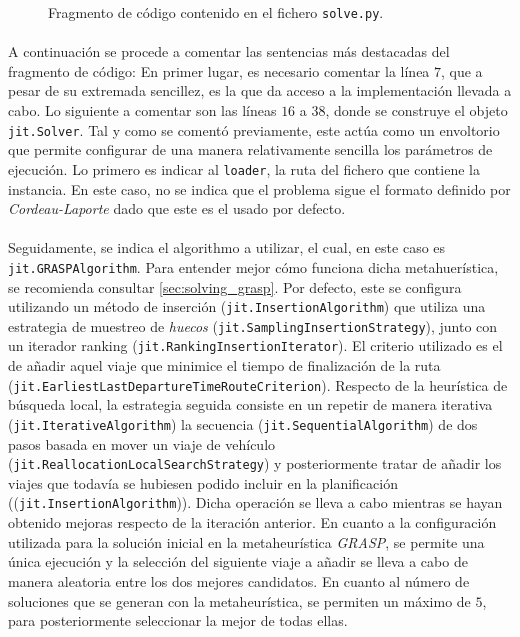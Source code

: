 \documentclass{subfiles}
\begin{document}
        \begin{figure}[!hb]
          \centering
          \inputminted[frame=single,framesep=10pt,linenos]{python}{./code/solve.py}
          \caption{Fragmento de código contenido en el fichero \texttt{solve.py}.}
          \label{code:solve}
        \end{figure}

        \paragraph{}
        A continuación se procede a comentar las sentencias más destacadas del fragmento de código: En primer lugar, es necesario comentar la línea $7$, que a pesar de su extremada sencillez, es la que da acceso a la implementación llevada a cabo. Lo siguiente a comentar son las líneas $16$ a $38$, donde se construye el objeto \texttt{jit.Solver}. Tal y como se comentó previamente, este actúa como un envoltorio que permite configurar de una manera relativamente sencilla los parámetros de ejecución. Lo primero es indicar al \texttt{loader}, la ruta del fichero que contiene la instancia. En este caso, no se indica que el problema sigue el formato definido por \emph{Cordeau-Laporte} dado que este es el usado por defecto.

        \paragraph{}
        Seguidamente, se indica el algorithmo a utilizar, el cual, en este caso es \texttt{jit.GRASPAlgorithm}. Para entender mejor cómo funciona dicha metahuerística, se recomienda consultar \cref{sec:solving_grasp}. Por defecto, este se configura utilizando un método de inserción (\texttt{jit.InsertionAlgorithm}) que utiliza una estrategia de muestreo de \emph{huecos} (\texttt{jit.SamplingInsertionStrategy}), junto con un iterador ranking (\texttt{jit.RankingInsertionIterator}). El criterio utilizado es el de añadir aquel viaje que minimice el tiempo de finalización de la ruta (\texttt{jit.EarliestLastDepartureTimeRouteCriterion}). Respecto de la heurística de búsqueda local, la estrategia seguida consiste en un repetir de manera iterativa (\texttt{jit.IterativeAlgorithm}) la secuencia (\texttt{jit.SequentialAlgorithm}) de dos pasos basada en mover un viaje de vehículo (\texttt{jit.ReallocationLocalSearchStrategy}) y posteriormente tratar de añadir los viajes que todavía se hubiesen podido incluir en la planificación ((\texttt{jit.InsertionAlgorithm})). Dicha operación se lleva a cabo mientras se hayan obtenido mejoras respecto de la iteración anterior. En cuanto a la configuración utilizada para la solución inicial en la metaheurística \emph{GRASP}, se permite una única ejecución y la selección del siguiente viaje a añadir se lleva a cabo de manera aleatoria entre los dos mejores candidatos. En cuanto al número de soluciones que se generan con la metaheurística, se permiten un máximo de $5$, para posteriormente seleccionar la mejor de todas ellas.
\end{document}
